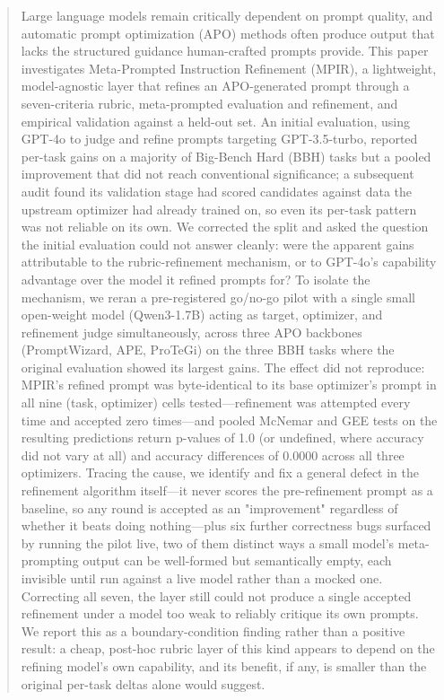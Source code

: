 \documentclass[a4paper,fleqn]{cas-sc}
\begin{document}
\begin{abstract}
Large language models remain critically dependent on prompt quality, and automatic prompt optimization (APO) methods often produce output that lacks the structured guidance human-crafted prompts provide. This paper investigates Meta-Prompted Instruction Refinement (MPIR), a lightweight, model-agnostic layer that refines an APO-generated prompt through a seven-criteria rubric, meta-prompted evaluation and refinement, and empirical validation against a held-out set. An initial evaluation, using GPT-4o to judge and refine prompts targeting GPT-3.5-turbo, reported per-task gains on a majority of Big-Bench Hard (BBH) tasks but a pooled improvement that did not reach conventional significance; a subsequent audit found its validation stage had scored candidates against data the upstream optimizer had already trained on, so even its per-task pattern was not reliable on its own. We corrected the split and asked the question the initial evaluation could not answer cleanly: were the apparent gains attributable to the rubric-refinement mechanism, or to GPT-4o's capability advantage over the model it refined prompts for? To isolate the mechanism, we reran a pre-registered go/no-go pilot with a single small open-weight model (Qwen3-1.7B) acting as target, optimizer, and refinement judge simultaneously, across three APO backbones (PromptWizard, APE, ProTeGi) on the three BBH tasks where the original evaluation showed its largest gains. The effect did not reproduce: MPIR's refined prompt was byte-identical to its base optimizer's prompt in all nine (task, optimizer) cells tested---refinement was attempted every time and accepted zero times---and pooled McNemar and GEE tests on the resulting predictions return p-values of 1.0 (or undefined, where accuracy did not vary at all) and accuracy differences of 0.0000 across all three optimizers. Tracing the cause, we identify and fix a general defect in the refinement algorithm itself---it never scores the pre-refinement prompt as a baseline, so any round is accepted as an "improvement" regardless of whether it beats doing nothing---plus six further correctness bugs surfaced by running the pilot live, two of them distinct ways a small model's meta-prompting output can be well-formed but semantically empty, each invisible until run against a live model rather than a mocked one. Correcting all seven, the layer still could not produce a single accepted refinement under a model too weak to reliably critique its own prompts. We report this as a boundary-condition finding rather than a positive result: a cheap, post-hoc rubric layer of this kind appears to depend on the refining model's own capability, and its benefit, if any, is smaller than the original per-task deltas alone would suggest.
\end{abstract}
\end{document}
